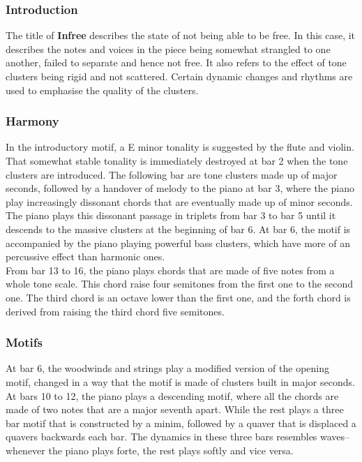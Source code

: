 \documentclass{article}
\begin{document}
\subsubsection{Introduction}

The title of \textbf{Infree} describes the state of not being able to be free.
In this case, it describes the notes and voices in the piece being somewhat
strangled to one another, failed to separate and hence not free.  It also
refers to the effect of tone clusters being rigid and not scattered. Certain
dynamic changes and rhythms are used to emphasise the quality of the
clusters.\\

\subsubsection{Harmony}

In the introductory motif, a E minor tonality is suggested by the flute and
violin.  That somewhat stable tonality is immediately destroyed at bar 2 when
the tone clusters are introduced.  The following bar are tone clusters made up
of major seconds, followed by a handover of melody to the piano at bar 3, where
the piano play increasingly dissonant chords that are eventually made up of
minor seconds.\\

The piano plays this dissonant passage in triplets from bar 3 to bar 5 until it
descends to the massive clusters at the beginning of bar 6.  At bar 6, the
motif is accompanied by the piano playing powerful bass clusters, which have
more of an percussive effect than harmonic ones.\\

From bar 13 to 16, the piano plays chords that are made of five notes from a whole
tone scale. This chord raise four semitones from the first one to the second one.
The third chord is an octave lower than the first one, and the forth chord is
derived from raising the third chord five semitones.\\

\subsubsection{Motifs}


At bar 6, the woodwinds and strings play a modified version of the opening
motif, changed in a way that the motif is made of clusters built in major
seconds.  At bars 10 to 12, the piano plays a descending motif, where all the
chords are made of two notes that are a major seventh apart.  While the rest
plays a three bar motif that is constructed by a minim, followed by a quaver
that is displaced a quavers backwards each bar.  The dynamics in these three bars
resembles waves--whenever the piano plays forte, the rest plays softly and vice
versa.\\
\end{document}
